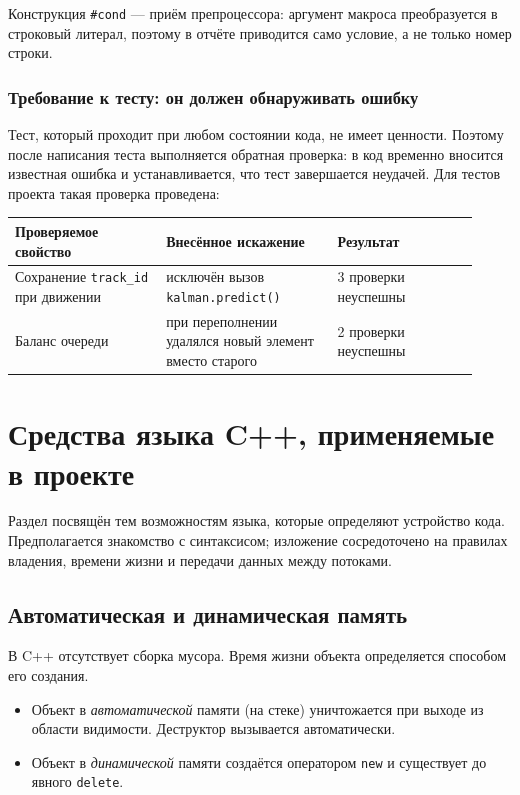 \documentclass[11pt,a4paper]{article}
\theoremstyle{definition}
\theoremstyle{remark}
\begin{document}
Конструкция \texttt{\#cond} --- приём препроцессора: аргумент макроса
преобразуется в строковый литерал, поэтому в отчёте приводится само условие,
а не только номер строки.

\subsubsection{Требование к тесту: он должен обнаруживать ошибку}

Тест, который проходит при любом состоянии кода, не имеет ценности. Поэтому
после написания теста выполняется обратная проверка: в код временно вносится
известная ошибка и устанавливается, что тест завершается неудачей. Для тестов
проекта такая проверка проведена:

\begin{center}
\begin{tabular}{p{0.30\linewidth}p{0.34\linewidth}p{0.28\linewidth}}
\toprule
Проверяемое свойство & Внесённое искажение & Результат \\
\midrule
Сохранение \texttt{track\_id} при движении & исключён вызов
\texttt{kalman.predict()} & 3 проверки неуспешны \\
Баланс очереди & при переполнении удалялся новый элемент вместо старого &
2 проверки неуспешны \\
\bottomrule
\end{tabular}
\end{center}

\section{Средства языка C++, применяемые в проекте}
\label{sec:cpp}

Раздел посвящён тем возможностям языка, которые определяют устройство кода.
Предполагается знакомство с синтаксисом; изложение сосредоточено на правилах
владения, времени жизни и передачи данных между потоками.

\subsection{Автоматическая и динамическая память}

В C++ отсутствует сборка мусора. Время жизни объекта определяется способом
его создания.

\begin{itemize}
  \item Объект в \emph{автоматической} памяти (на стеке) уничтожается при
        выходе из области видимости. Деструктор вызывается автоматически.
  \item Объект в \emph{динамической} памяти создаётся оператором \texttt{new}
        и существует до явного \texttt{delete}.
\end{itemize}
\end{document}
